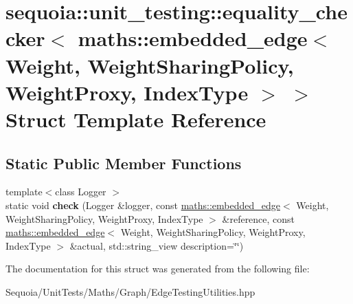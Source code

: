 \hypertarget{structsequoia_1_1unit__testing_1_1equality__checker_3_01maths_1_1embedded__edge_3_01_weight_00_0bfb4ac40577c934cc68d1097b5e85934}{}\section{sequoia\+::unit\+\_\+testing\+::equality\+\_\+checker$<$ maths\+::embedded\+\_\+edge$<$ Weight, Weight\+Sharing\+Policy, Weight\+Proxy, Index\+Type $>$ $>$ Struct Template Reference}
\label{structsequoia_1_1unit__testing_1_1equality__checker_3_01maths_1_1embedded__edge_3_01_weight_00_0bfb4ac40577c934cc68d1097b5e85934}
\subsection*{Static Public Member Functions}
\begin{DoxyCompactItemize}
\item 
\mbox{\label{structsequoia_1_1unit__testing_1_1equality__checker_3_01maths_1_1embedded__edge_3_01_weight_00_0bfb4ac40577c934cc68d1097b5e85934_a7febe482faa627dd209a71ebd7555964}} 
{\footnotesize template$<$class Logger $>$ }\\static void {\bfseries check} (Logger \&logger, const \mbox{\hyperlink{classsequoia_1_1maths_1_1embedded__edge}{maths\+::embedded\+\_\+edge}}$<$ Weight, Weight\+Sharing\+Policy, Weight\+Proxy, Index\+Type $>$ \&reference, const \mbox{\hyperlink{classsequoia_1_1maths_1_1embedded__edge}{maths\+::embedded\+\_\+edge}}$<$ Weight, Weight\+Sharing\+Policy, Weight\+Proxy, Index\+Type $>$ \&actual, std\+::string\+\_\+view description=\char`\"{}\char`\"{})
\end{DoxyCompactItemize}


The documentation for this struct was generated from the following file\+:\begin{DoxyCompactItemize}
\item 
Sequoia/\+Unit\+Tests/\+Maths/\+Graph/Edge\+Testing\+Utilities.\+hpp\end{DoxyCompactItemize}
